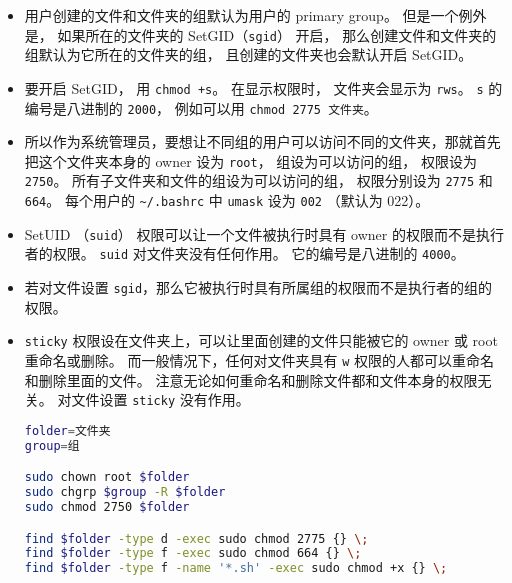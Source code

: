 \begin{itemize}
\item 用户创建的文件和文件夹的组默认为用户的 primary group。 但是一个例外是， 如果所在的文件夹的 SetGID（\verb`sgid`） 开启， 那么创建文件和文件夹的组默认为它所在的文件夹的组， 且创建的文件夹也会默认开启 SetGID。
\item 要开启 SetGID， 用 \verb`chmod +s`。 在显示权限时， 文件夹会显示为 \verb`rws`。 \verb`s` 的编号是八进制的 \verb`2000`， 例如可以用 \verb`chmod 2775 文件夹`。
\item 所以作为系统管理员，要想让不同组的用户可以访问不同的文件夹，那就首先把这个文件夹本身的 owner 设为 \verb`root`， 组设为可以访问的组， 权限设为 \verb`2750`。 所有子文件夹和文件的组设为可以访问的组， 权限分别设为 \verb`2775` 和 \verb`664`。 每个用户的 \verb`~/.bashrc` 中 \verb`umask` 设为 \verb`002` （默认为 022）。
\item SetUID （\verb`suid`） 权限可以让一个文件被执行时具有 owner 的权限而不是执行者的权限。 \verb`suid` 对文件夹没有任何作用。 它的编号是八进制的 \verb`4000`。
\item 若对文件设置 \verb`sgid`，那么它被执行时具有所属组的权限而不是执行者的组的权限。
\item \verb`sticky` 权限设在文件夹上，可以让里面创建的文件只能被它的 owner 或 root 重命名或删除。 而一般情况下，任何对文件夹具有 \verb`w` 权限的人都可以重命名和删除里面的文件。 注意无论如何重命名和删除文件都和文件本身的权限无关。 对文件设置 \verb`sticky` 没有作用。
\begin{lstlisting}[language=bash]
folder=文件夹
group=组

sudo chown root $folder
sudo chgrp $group -R $folder
sudo chmod 2750 $folder

find $folder -type d -exec sudo chmod 2775 {} \;
find $folder -type f -exec sudo chmod 664 {} \;
find $folder -type f -name '*.sh' -exec sudo chmod +x {} \;


\end{lstlisting}
\end{itemize}
